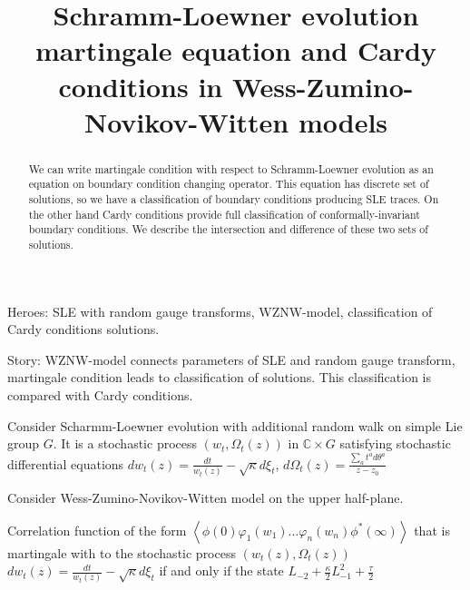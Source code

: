 \documentclass[12pt]{article}
\begin{document}
\title{Schramm-Loewner evolution martingale equation and Cardy conditions in Wess-Zumino-Novikov-Witten models}

\maketitle

\begin{abstract}
  We can write martingale condition with respect to Schramm-Loewner evolution as an equation on
  boundary condition changing operator. This equation has discrete set of solutions, so we have a
  classification of boundary conditions producing SLE traces. On the other hand Cardy conditions
  provide full classification of conformally-invariant boundary conditions. We describe the
  intersection and difference of these two sets of solutions. 
\end{abstract}

Heroes: SLE with random gauge transforms, WZNW-model, classification of Cardy conditions solutions. 

Story: WZNW-model connects parameters of SLE and random gauge transform, martingale condition leads
to classification of solutions. This classification is compared with Cardy conditions. 

Consider Scharmm-Loewner evolution with additional random walk on simple Lie group $G$. It is a
stochastic process $(w_{t}, \Omega_{t}(z))$ in $\mathbb{C}\times G$ satisfying stochastic
differential equations $d w_{t}(z)=\frac{dt}{w_{t}(z)}-\sqrt{\kappa} d\xi_{t}$, $d \Omega_{t}(z) =
\frac{\sum_{a} t^{a} d\theta^{a}}{z-z_{0}}$

Consider Wess-Zumino-Novikov-Witten model on the upper half-plane.


 Correlation function of the form
$\left<\phi(0) \varphi_{1}(w_{1})\dots \varphi_{n}(w_{n}) \phi^{*}(\infty)\right>$ that is
martingale with to the stochastic process $(w_{t}(z), \Omega_{t}(z))$ $d w_{t}(z)=\frac{dt}{w_{t}(z)}-\sqrt{\kappa} d\xi_{t}$ if
and only if the state $L_{-2}+\frac{\kappa}{2} L_{-1}^{2} +\frac{\tau}{2}$
\end{document}
